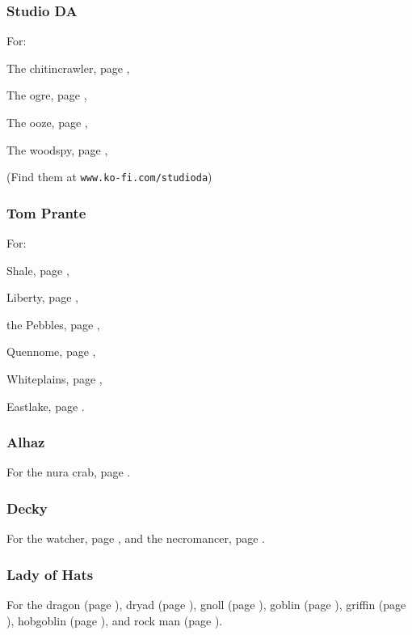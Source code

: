 \begin{multicols}{2}
\subsubsection{Studio DA}

For:

The chitincrawler, page \pageref{da:chitincrawler},

The ogre, page \pageref{da:ogre},

The ooze, page \pageref{da:jelly},

The woodspy, page \pageref{da:woodspy},

(Find them at {\tt www.ko-fi.com/studioda})

\subsubsection{Tom Prante}

For:

Shale, page \pageref{tom:autumn},

Liberty, page \pageref{tom:swamp},

the Pebbles, page \pageref{tom:pebbles},

Quennome, page \pageref{tom:quen},

Whiteplains, page \pageref{tom:whiteplains},

Eastlake, page \pageref{tom:winter}.

\subsubsection{Alhaz}

For the nura crab, page \pageref{Alhaz:crab}.

\subsubsection{Decky}

For the watcher, page \pageref{Decky:watcher},
and the necromancer, page \pageref{Decky/necromancer}.

\subsubsection{Lady of Hats}

For the 
dragon (page \pageref{loh/dragon}),
dryad (page \pageref{loh/dryad}),
gnoll (page \pageref{loh/gnoll}),
goblin (page \pageref{loh/goblin}),
griffin (page \pageref{loh/griffin}),
hobgoblin (page \pageref{loh/hobgoblin}),
and rock man (page \pageref{loh/rockman}).

\end{multicols}

